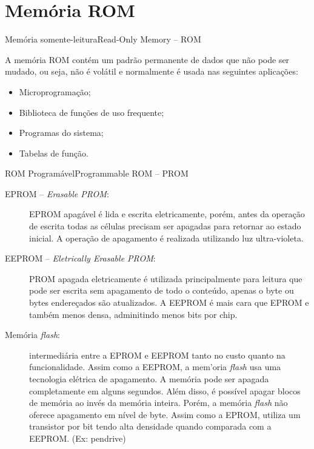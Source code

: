 \section{Memória ROM}

\begin{frame}{Mem\'{o}ria somente-leitura}{Read-Only Memory -- ROM}

A memória \alert{ROM} contém um padrão permanente de dados
que não pode ser mudado, ou seja, \alert{não é volátil} 
e normalmente é usada nas seguintes aplicações:

\begin{itemize}
\item Microprogramação;
\item Biblioteca de funções de uso frequente;
\item Programas do sistema;
\item Tabelas de função.
\end{itemize}

\end{frame}

\begin{frame}{ROM Programável}{Programmable ROM -- PROM}
\footnotesize
\begin{description}
\item[EPROM -- \textit{Erasable PROM}:] \alert{EPROM apagável} é 
lida e escrita eletricamente, porém, antes da operação de escrita
todas as células precisam ser apagadas para retornar ao estado 
inicial. A operaç\~ao de apagamento \'{e} realizada utilizando
luz ultra-violeta.
\pause
\item[EEPROM -- \textit{Eletrically Erasable PROM}:] 
\alert{PROM apagada eletricamente} \'e utilizada principalmente
para leitura que pode ser escrita sem apagamento de todo o 
conte\'{u}do, apenas o byte ou bytes endereçados s\~ ao
atualizados. A EEPROM é mais cara que EPROM e também menos
densa, adminitindo menos bits por chip.
\pause
\item[Memória \textit{flash}:] intermedi\'{a}ria entre a
EPROM e EEPROM tanto no custo quanto na funcionalidade. 
Assim como a EEPROM, a mem'oria \textit{flash} usa uma tecnologia
el\'{e}trica de apagamento. A mem\'{o}ria pode ser apagada
completamente em alguns segundos. Al\'em disso, \'{e} 
poss\'{i}vel apagar blocos de mem\'{o}ria ao inv\'es da 
mem\'oria inteira. Por\'em, a mem\'oria \textit{flash} n\~ao
oferece apagamento em n\'ivel de byte. Assim como a EPROM,
utiliza um transistor por bit tendo alta densidade quando
comparada com a EEPROM. (Ex: pendrive)
\end{description}
\end{frame}


